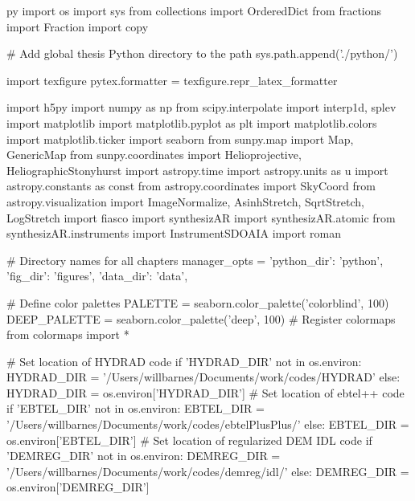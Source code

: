 \begin{pythontexcustomcode}{py}
import os
import sys
from collections import OrderedDict
from fractions import Fraction
import copy

# Add global thesis Python directory to the path
sys.path.append('./python/')

import texfigure
pytex.formatter = texfigure.repr_latex_formatter

import h5py
import numpy as np
from scipy.interpolate import interp1d, splev
import matplotlib
import matplotlib.pyplot as plt
import matplotlib.colors
import matplotlib.ticker
import seaborn
from sunpy.map import Map, GenericMap
from sunpy.coordinates import Helioprojective, HeliographicStonyhurst
import astropy.time
import astropy.units as u
import astropy.constants as const
from astropy.coordinates import SkyCoord
from astropy.visualization import ImageNormalize, AsinhStretch, SqrtStretch, LogStretch
import fiasco
import synthesizAR
import synthesizAR.atomic
from synthesizAR.instruments import InstrumentSDOAIA
import roman

# Directory names for all chapters
manager_opts = {'python_dir': 'python', 'fig_dir': 'figures', 'data_dir': 'data',}

# Define color palettes
PALETTE = seaborn.color_palette('colorblind', 100)
DEEP_PALETTE = seaborn.color_palette('deep', 100)
# Register colormaps
from colormaps import *

# Set location of HYDRAD code
if 'HYDRAD_DIR' not in os.environ:
	HYDRAD_DIR = '/Users/willbarnes/Documents/work/codes/HYDRAD'
else:
	HYDRAD_DIR = os.environ['HYDRAD_DIR']
# Set location of ebtel++ code
if 'EBTEL_DIR' not in os.environ:
	EBTEL_DIR = '/Users/willbarnes/Documents/work/codes/ebtelPlusPlus/'
else:
	EBTEL_DIR = os.environ['EBTEL_DIR']
# Set location of regularized DEM IDL code
if 'DEMREG_DIR' not in os.environ:
	DEMREG_DIR = '/Users/willbarnes/Documents/work/codes/demreg/idl/'
else:
	DEMREG_DIR = os.environ['DEMREG_DIR']


\end{pythontexcustomcode}
